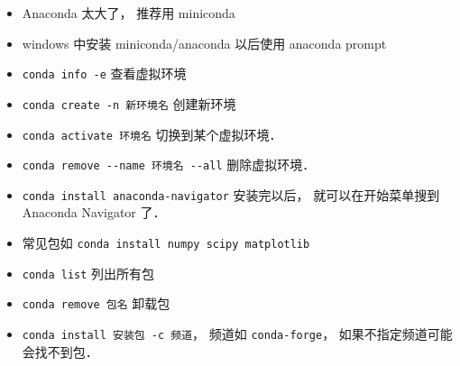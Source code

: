 
\begin{itemize}
\item Anaconda 太大了， 推荐用 miniconda
\item windows 中安装 miniconda/anaconda 以后使用 anaconda prompt
\item \verb|conda info -e| 查看虚拟环境
\item \verb|conda create -n 新环境名| 创建新环境
\item \verb|conda activate 环境名| 切换到某个虚拟环境．
\item \verb|conda remove --name 环境名 --all| 删除虚拟环境．
\item \verb|conda install anaconda-navigator| 安装完以后， 就可以在开始菜单搜到 Anaconda Navigator 了．
\item 常见包如 \verb|conda install numpy scipy matplotlib|
\item \verb|conda list| 列出所有包
\item \verb|conda remove 包名| 卸载包
\item \verb|conda install 安装包 -c 频道|， 频道如 \verb|conda-forge|， 如果不指定频道可能会找不到包．
\end{itemize}
